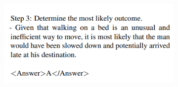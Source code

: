 \documentclass{beamer}
\begin{document}
\begin{frame}
\begin{columns}
\begin{column}{0.5\textwidth}
\begin{figure}
\begin{subfigure}{\textwidth}
				\end{subfigure}
				\begin{subfigure}{\textwidth}
					\centering
					\includegraphics[scale=0.5]{imgs/counterfactual_prompt4.png}	
				\end{subfigure}
			\end{figure}
		\end{column}
	\end{columns}
\end{frame}
\end{document}

